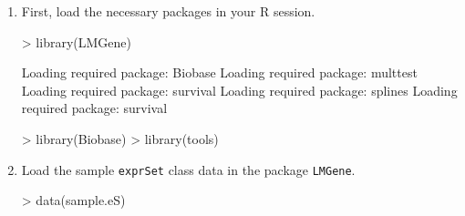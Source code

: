\documentclass[11pt]{article}
\begin{document}
\begin{enumerate}

\item First, load the necessary packages in your R session.
\begin{Schunk}
\begin{Sinput}
> library(LMGene)
\end{Sinput}
\begin{Soutput}
Loading required package: Biobase
Loading required package: multtest
Loading required package: survival
Loading required package: splines
Loading required package: survival
\end{Soutput}
\begin{Sinput}
> library(Biobase)
> library(tools)
\end{Sinput}
\end{Schunk}

\item Load the sample {\tt exprSet} class data in the package {\tt LMGene}.
\begin{Schunk}
\begin{Sinput}
> data(sample.eS)
\end{Sinput}
\end{Schunk}


\end{enumerate}
\end{document}
